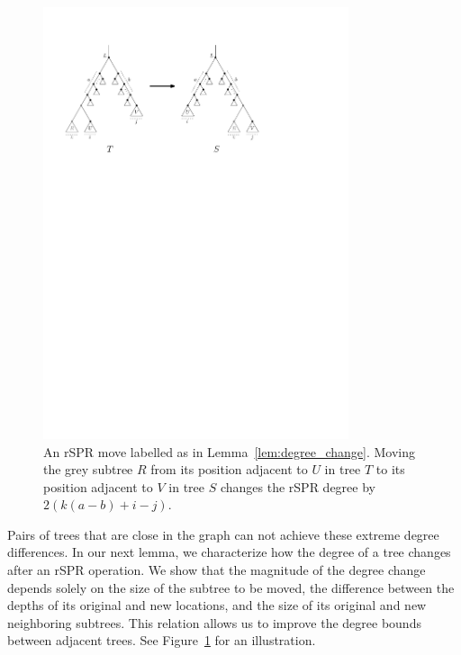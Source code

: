 \documentclass[]{elsarticle}
\let\MYoriglatexcaption\caption
\renewcommand{\caption}[2][\relax]{\MYoriglatexcaption[#2]{#2}}
\begin{document}
\begin{figure}
	\includegraphics[width=0.8\textwidth]{figs/spr-degree-change}
	\caption{An rSPR move labelled as in Lemma~\ref{lem:degree_change}.
Moving the grey subtree $R$ from its position adjacent to $U$ in tree $T$ to its position adjacent to $V$ in tree $S$ changes the rSPR degree by $2\left(k(a-b) + i - j\right)$.}
	\label{fig:spr-degree-change}
\end{figure}

Pairs of trees that are close in the graph can not achieve these extreme degree differences.
In our next lemma, we characterize how the degree of a tree changes after an rSPR operation.
We show that the magnitude of the degree change depends solely on the size of the subtree to be moved, the difference between the depths of its original and new locations, and the size of its original and new neighboring subtrees.
This relation allows us to improve the degree bounds between adjacent trees.
See Figure~\ref{fig:spr-degree-change} for an illustration.
\end{document}
